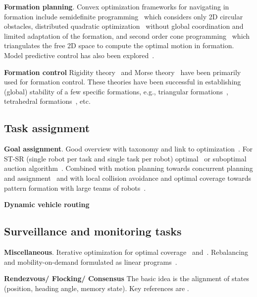\textbf{Formation planning}.
Convex optimization frameworks for navigating in formation include semidefinite programming~\cite{Derenick:2010cc} which considers only 2D circular obstacles, distributed quadratic optimization~\cite{AlonsoMora:2015wi} without global coordination and limited adaptation of the formation,
and second order cone programming~\cite{Derenick:ha} which triangulates the free 2D space to compute the optimal motion in formation. Model predictive control has also been explored~\cite{Dunbar:2002fh}.

\textbf{Formation control} Rigidity theory~\cite{Eren.Belhumeur.ea:02} and Morse theory~\cite{Anderson:11} have been primarily used for formation control. These theories have been successful in establishing (global) stability of a few specific formations, e.g., triangular formations~\cite{Cao.Morse.ea:11}, tetrahedral formations~\cite{Anderson.Yu.ea:10}, etc.

\subsection{Task assignment}

\textbf{Goal assignment}.
Good overview with taxonomy and link to optimization~\cite{Gerkey:2004il}. For ST-SR (single robot per task and single task per robot) optimal~\cite{kuhn55} or suboptimal auction algorithm~\cite{Bertsekas:1992wx}.
Combined with motion planning towards concurrent planning and assignment~\cite{Turpin:2014bu} and with local collision avoidance and optimal coverage towards pattern formation with large teams of robots~\cite{alonsomora12ijrr}.

\textbf{Dynamic vehicle routing} \cite{Bullo.Frazzoli.ea:PIEEE10}

\subsection{Surveillance and monitoring tasks}


\textbf{Miscellaneous}. 
Iterative optimization for optimal coverage~\cite{cortes04} and~\cite{Schwager:2009fz}. Rebalancing and mobility-on-demand formulated as linear programs~\cite{Smith:2013fa}.

\textbf{Rendezvous/ Flocking/ Consensus} The basic idea is the alignment of states (position, heading angle, memory state). Key references are \cite{Cortes.Martinez.ea:06,Jadbabaie.Lin.ea:03}.

